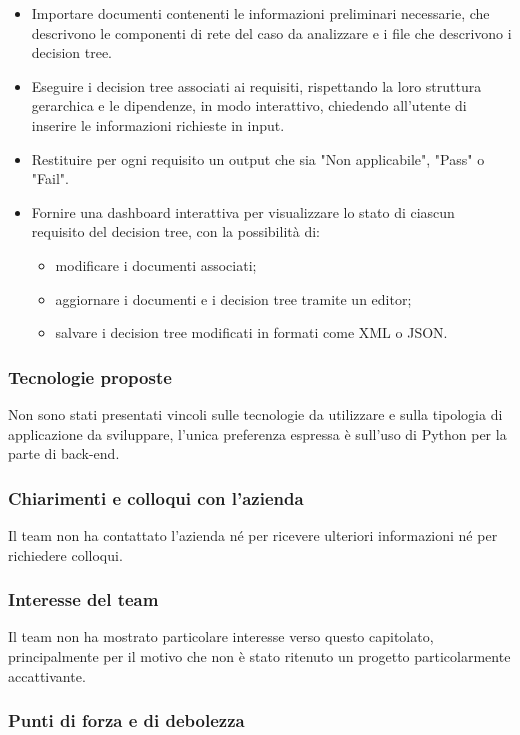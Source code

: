 \documentclass[a4paper,11pt]{article}
\begin{document}
\begin{itemize}[leftmargin=*]
  \item Importare documenti contenenti le informazioni preliminari necessarie, che descrivono le componenti di rete del caso da analizzare e i file che descrivono i decision tree.
  \item Eseguire i decision tree associati ai requisiti, rispettando la loro struttura gerarchica e le dipendenze, in modo interattivo, chiedendo all'utente di inserire le informazioni richieste in input.
  \item Restituire per ogni requisito un output che sia "Non applicabile", "Pass" o "Fail".
  \item Fornire una dashboard interattiva per visualizzare lo stato di ciascun requisito del decision tree, con la possibilità di:
  \begin{itemize}[leftmargin=*]
    \item modificare i documenti associati; 
    \item aggiornare i documenti e i decision tree tramite un editor; 
    \item salvare i decision tree modificati in formati come XML o JSON.
  \end{itemize}
\end{itemize}
\subsubsection{Tecnologie proposte}
Non sono stati presentati vincoli sulle tecnologie da utilizzare e sulla tipologia di applicazione da sviluppare, l'unica preferenza espressa è sull'uso di Python per la parte di back-end.
\subsubsection{Chiarimenti e colloqui con l'azienda}
Il team non ha contattato l'azienda né per ricevere ulteriori informazioni né per richiedere colloqui.
\subsubsection{Interesse del team}
Il team non ha mostrato particolare interesse verso questo capitolato, principalmente per il motivo che non è stato ritenuto un progetto particolarmente accattivante.
\newpage
\subsubsection{Punti di forza e di debolezza}
\end{document}
